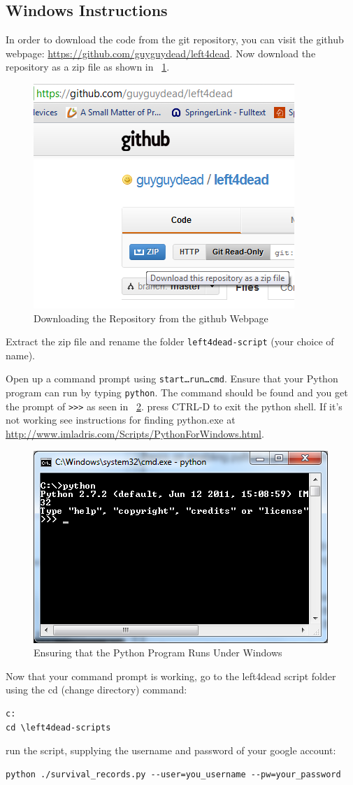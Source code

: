 \subsection{Windows Instructions}
In order to download the code from the git repository, you can visit the github webpage: \url{https://github.com/guyguydead/left4dead}. Now download the repository as a zip file as shown in \figurename\ \ref{fig:download_repository}.
\begin{figure}[htb]
\centering
\includegraphics[width=0.40\columnwidth]{download_repository}
\caption{Downloading the Repository from the github Webpage}
\label{fig:download_repository}
\end{figure}
Extract the zip file and rename the folder \texttt{left4dead-script} (your choice of name).

Open up a command prompt using \texttt{start\ldots{}run\ldots{}cmd}. Ensure that your Python program can run by typing \texttt{python}. The command should be found and you get the prompt of \texttt{>>>} as seen in \figurename\ \ref{fig:python_windows}. press CTRL-D to exit the python shell. If it's not working see instructions for finding python.exe at \url{http://www.imladris.com/Scripts/PythonForWindows.html}.
\begin{figure}[htb]
\centering
\includegraphics[width=0.4\columnwidth]{python_windows}
\caption{Ensuring that the Python Program Runs Under Windows}
\label{fig:python_windows}
\end{figure}

Now that your command prompt is working, go to the left4dead script folder using the cd (change directory) command:
\begin{lstlisting}
c:
cd \left4dead-scripts
\end{lstlisting}
run the script, supplying the username and password of your google account:
\begin{lstlisting}
python ./survival_records.py --user=you_username --pw=your_password
\end{lstlisting}

